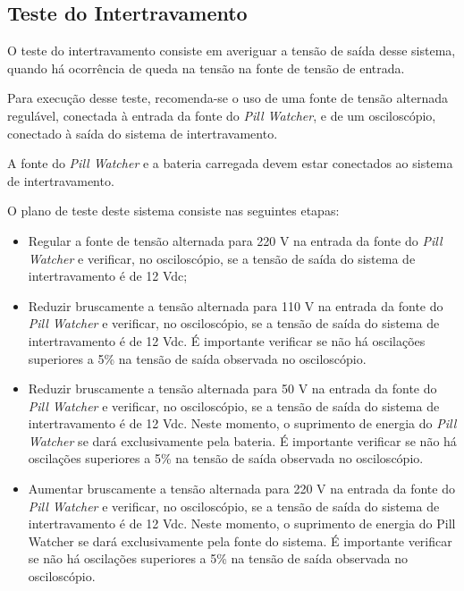 \subsection{Teste do Intertravamento}
O teste do intertravamento consiste em averiguar a tensão de saída desse sistema, quando há ocorrência de queda na tensão na fonte de tensão de entrada.

Para execução desse teste, recomenda-se o uso de uma fonte de tensão alternada regulável, conectada à entrada da fonte do \textit{Pill Watcher}, e de um osciloscópio, conectado à saída do sistema de intertravamento. 

A fonte do \textit{Pill Watcher} e a bateria carregada devem estar conectados ao sistema de intertravamento.

O plano de teste deste sistema consiste nas seguintes etapas:

\begin{itemize}

              \item Regular a fonte de tensão alternada para 220 V na entrada da fonte do \textit{Pill Watcher} e verificar, no osciloscópio, se a tensão de saída do sistema de intertravamento é de 12 Vdc;
              \item Reduzir bruscamente a tensão alternada para 110 V na entrada da fonte do \textit{Pill Watcher} e verificar, no osciloscópio, se a tensão de saída do sistema de intertravamento é de 12 Vdc. É importante verificar se não há oscilações superiores a 5\% na tensão de saída observada no osciloscópio.
             \item Reduzir bruscamente a tensão alternada para 50 V na entrada da fonte do \textit{Pill Watcher} e verificar, no osciloscópio, se a tensão de saída do sistema de intertravamento é de 12 Vdc. Neste momento, o suprimento de energia do \textit{Pill Watcher} se dará exclusivamente pela bateria. É importante verificar se não há oscilações superiores a 5\% na tensão de saída observada no osciloscópio.
             \item Aumentar bruscamente a tensão alternada para 220 V na entrada da fonte do \textit{Pill Watcher} e verificar, no osciloscópio, se a tensão de saída do sistema de intertravamento é de 12 Vdc. Neste momento, o suprimento de energia do Pill Watcher se dará exclusivamente pela fonte do sistema. É importante verificar se não há oscilações superiores a 5\% na tensão de saída observada no osciloscópio.
     
\end{itemize}
